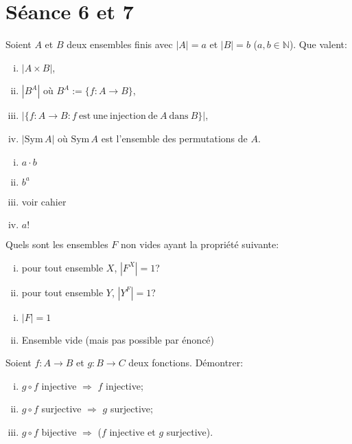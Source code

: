 \section{Séance 6 et 7}

\begin{exo}
Soient $A$ et $B$ deux ensembles finis avec $|A|=a$ et $|B|=b$ ($a,b \in \mathbb{N}$). Que valent:
\begin{enumerate}[(i)]
\item $|A\times B|$,
\item $|B^A|$ o\`u $B^A:=\{f:A \rightarrow B\}$,
\item $|\{f:A \rightarrow B: f \mathrm{~est~une~injection~de~} A \mathrm{~dans~}B\}|$,
\item $|\mathrm{Sym}\,A|$ o\`u $\mathrm{Sym}\,A$ est l'ensemble des permutations de $A$.
\end{enumerate}
\end{exo}

\begin{enumerate}[(i)]
	\item $a\cdot b$
	\item $b^a$
	\item voir cahier
	\item $a!$
\end{enumerate}


\begin{exo}
Quels sont les ensembles $F$ non vides ayant la propri\'et\'e suivante:
\begin{enumerate}[(i)]
\item pour tout ensemble $X$, $|F^X|=1$?
\item pour tout ensemble $Y$, $|Y^F|=1$?
\end{enumerate}
\end{exo}

\begin{enumerate}[(i)]
	\item $|F| = 1 $
	\item Ensemble vide (mais pas possible par énoncé)
\end{enumerate}


\begin{exo}
Soient $f:A \rightarrow B$ et $g:B \rightarrow C$ deux fonctions. D\'emontrer:
\begin{enumerate}[(i)]
\item $g \circ f$ injective $\Rightarrow$ $f$ injective;
\item $g \circ f$ surjective $\Rightarrow$ $g$ surjective;
\item $g \circ f$ bijective $\Rightarrow$ ($f$ injective et $g$ surjective).
\end{enumerate}
\end{exo}

